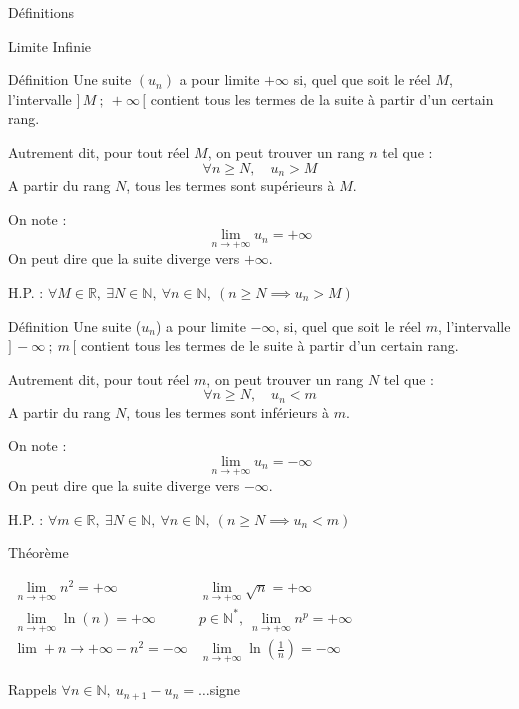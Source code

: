 \documentclass{cours}
\begin{document}
    \begin{Gpartie}{Définitions} 
        \begin{Spartie}{Limite Infinie}
            \vspace*{-2ex}
            \begin{SSpartie}{Définition} 
                Une suite $(u_n)$ a pour limite $+\infty$ si, quel que soit le réel $M$, l'intervalle $\big]\,M~;~+\infty\,\big[$ contient tous les termes de la suite à partir d'un certain rang.

                Autrement dit, pour tout réel $M$, on peut trouver un rang $n$ tel que : \[\forall n\geq N,\quad u_n>M\]
                A partir du rang $N$, tous les termes sont supérieurs à $M$.

                On note : \[\boxed{\lim\limits_{n\to +\infty} u_n=+\infty}\] On peut dire que la suite diverge vers $+\infty$.

                H.P. : $\forall M\in\mathbb{R},~\exists N\in\mathbb{N},~\forall n\in\mathbb{N},~(n\geq N\implies u_n>M)$
            \end{SSpartie}
            \begin{SSpartie}{Définition} 
                Une suite ($u_n$) a pour limite $-\infty$, si, quel que soit le réel $m$, l'intervalle $\big]\,-\infty~;~m\,\big[$ contient tous les termes de le suite à partir d'un certain rang.

                Autrement dit, pour tout réel $m$, on peut trouver un rang $N$ tel que : \[\forall n\geq N,\quad u_n<m\]
                A partir du rang $N$, tous les termes sont inférieurs à $m$.

                On note : \[\boxed{\lim\limits_{n\to +\infty} u_n=-\infty}\] On peut dire que la suite diverge vers $-\infty$.

                H.P. : $\forall m\in\mathbb{R},~\exists N\in\mathbb{N},~\forall n\in\mathbb{N},~(n\geq N\implies u_n<m)$
            \end{SSpartie}
            \begin{SSpartie}{Théorème}
                \begin{center}$\begin{array}{cc}
                    \lim\limits_{n\to +\infty} n^2=+\infty & \lim\limits_{n\to +\infty} \sqrt{n}=+\infty \\
    
                    \lim\limits_{n\to +\infty} \ln(n)=+\infty & p\in\mathbb{N^*},\ \lim\limits_{n\to +\infty} n^p=+\infty \\
                    \lim\limits+{n\to +\infty} -n^2=-\infty & \lim\limits_{n\to +\infty} \ln\left(\frac{1}{n}\right)=-\infty
                \end{array}$\end{center}
            \end{SSpartie}
            \begin{SSpartie}{Rappels} 
                $\forall n\in\mathbb{N},\ u_{n+1}-u_n=\dotsc$\quad signe


\end{SSpartie}
\end{Spartie}
\end{Gpartie}
\end{document}
